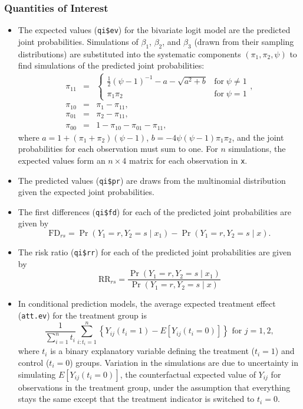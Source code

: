 \subsubsection{Quantities of Interest}
\begin{itemize}
\item The expected values ({\tt qi\$ev}) for the bivariate logit model
  are the predicted joint probabilities. Simulations of $\beta_1$,
  $\beta_2$, and $\beta_3$ (drawn from their sampling distributions)
  are substituted into the systematic components $(\pi_1, \pi_2,
  \psi)$ to find simulations of the predicted joint probabilities:
\begin{eqnarray*}
\pi_{11} & = & \left\{ \begin{array}{ll}
                 \frac{1}{2}(\psi - 1)^{-1} - {a - \sqrt{a^2 + b}} &
                 \textrm{for} \; \psi \ne 1 \\
                 \pi_1 \pi_2 & \textrm{for} \; \psi = 1 
                 \end{array} \right., \\
\pi_{10} &=& \pi_1 - \pi_{11}, \\
\pi_{01} &=& \pi_2 - \pi_{11}, \\
\pi_{00} &=& 1 - \pi_{10} - \pi_{01} - \pi_{11},
\end{eqnarray*}
where $a = 1 + (\pi_1 + \pi_2)(\psi - 1)$, $b = -4 \psi(\psi - 1)
\pi_1 \pi_2$, and the joint probabilities for each observation must sum
to one.  For $n$ simulations, the expected values form an $n \times 4$
matrix for each observation in {\tt x}.  

\item The predicted values ({\tt qi\$pr}) are draws from the
  multinomial distribution given the expected joint probabilities. 

\item The first differences ({\tt qi\$fd}) for each
  of the predicted joint probabilities are given by $$\textrm{FD}_{rs}
  = \Pr(Y_1=r, Y_2=s \mid x_1)-\Pr(Y_1=r, Y_2=s \mid x).$$  
  
\item The risk ratio ({\tt qi\$rr}) for each of the predicted joint
  probabilities are given by
\begin{equation*}
\textrm{RR}_{rs} = \frac{\Pr(Y_1=r, Y_2=s \mid x_1)}{\Pr(Y_1=r, Y_2=s \mid x)}
\end{equation*}

\item In conditional prediction models, the average expected treatment
  effect ({\tt att.ev}) for the treatment group is 
    \begin{equation*} \frac{1}{\sum_{i=1}^n t_i}\sum_{i:t_i=1}^n \left\{ Y_{ij}(t_i=1) -
      E[Y_{ij}(t_i=0)] \right\} \textrm{ for } j = 1,2,
    \end{equation*} 
    where $t_i$ is a binary explanatory variable defining the treatment
    ($t_i=1$) and control ($t_i=0$) groups.  Variation in the
    simulations are due to uncertainty in simulating $E[Y_{ij}(t_i=0)]$,
    the counterfactual expected value of $Y_{ij}$ for observations in the
    treatment group, under the assumption that everything stays the
    same except that the treatment indicator is switched to $t_i=0$.


\end{itemize}
